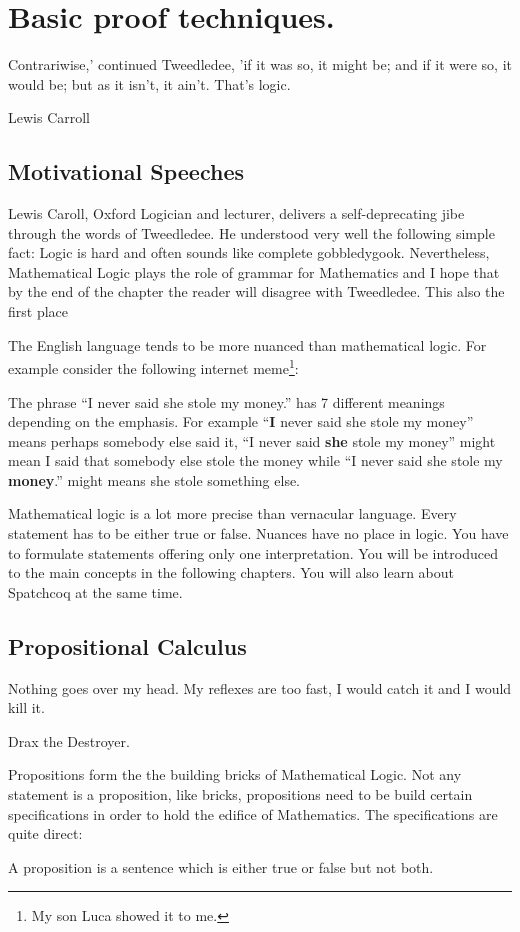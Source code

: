 \chapter{Basic proof techniques.}\label{chap:Basicproof}

\epigraph{Contrariwise,' continued Tweedledee, 'if it was so, it might be; and if it were so, it would be; but as it isn't, it ain't. That's logic.}{Lewis Carroll}

\section{Motivational Speeches}

 Lewis Caroll,  Oxford Logician and lecturer, delivers a self-deprecating jibe  through the words of Tweedledee. He understood very well the following  simple fact: Logic is hard and often sounds like complete gobbledygook. Nevertheless, Mathematical Logic plays the role of grammar for Mathematics and I hope that by the end of the chapter the reader will disagree with Tweedledee. This also the first place 
 
 

The English language tends to be more nuanced than mathematical logic. For example consider the following   internet meme\footnote{My son Luca showed it to me.}:

The phrase
``I never said she stole my money.'' has 7 different meanings depending on the emphasis. For example ``{\bf I } never said she stole my money'' means perhaps somebody else said it, ``I never said {\bf she} stole my money'' might mean I said that somebody else stole the money  while ``I never said she stole my {\bf money}.'' might means  she stole something else.

 Mathematical logic is a lot more precise than vernacular language. Every statement has to be either true or false. Nuances have no place in logic. You have to formulate statements offering only one interpretation. You will be introduced to the main concepts in the following	chapters. You will also learn about Spatchcoq at the same time.

\section{Propositional Calculus}
\epigraph{Nothing goes over my head. My reflexes are too fast, I would catch it and I would kill it. }{ Drax the Destroyer.}

Propositions form the the building bricks of Mathematical Logic. Not any statement is a proposition, like bricks, propositions need to be build certain specifications in order to hold the edifice of Mathematics. The specifications are quite direct:
\begin{Definition}
A proposition is a sentence which is either true or false but not both.
\end{Definition}

